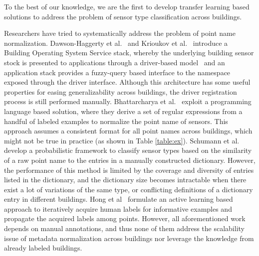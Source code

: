 To the best of our knowledge, we are the first to develop transfer learning
based solutions to address the problem of sensor type classification across
buildings.

Researchers have tried to systematically address the problem of point name
normalization. Dawson-Haggerty et al.~\cite{boss} and Krioukov et al.~\cite{bas}
introduce a Building Operating System Service stack, whereby the underlying
building sensor stock is presented to applications through a driver-based model
\ and an application stack provides a fuzzy-query based interface to the
namespace exposed through the driver interface. Although this architecture has
some useful properties for easing generalizability across buildings, the driver
registration process is still performed manually. Bhattarcharya et
al.~\cite{arka} exploit a programming language based solution, where they derive
a set of regular expressions from a handful of labeled examples to normalize the
point name of sensors. This approach assumes a consistent format for all point
names across buildings, which might not be true in practice (as shown in Table
\ref{table:ex}). Schumann et al.~\cite{ibm} develop a probabilistic framework to
classify sensor types based on the similarity of a raw point name to the entries
in a manually constructed dictionary. However, the performance of this method is
limited by the coverage and diversity of entries listed in the dictionary, and
the dictionary size becomes intractable when there exist a lot of variations of
the same type, or conflicting definitions of a dictionary entry in different
buildings. Hong et al~\cite{cikm} formulate an active learning based approach to
iteratively acquire human labels for informative examples and propagate the acquired labels among points. However, all aforementioned work depends on manual
annotations, and thus none of them address the scalability issue of metadata
normalization across buildings nor leverage the knowledge from already labeled
buildings.

